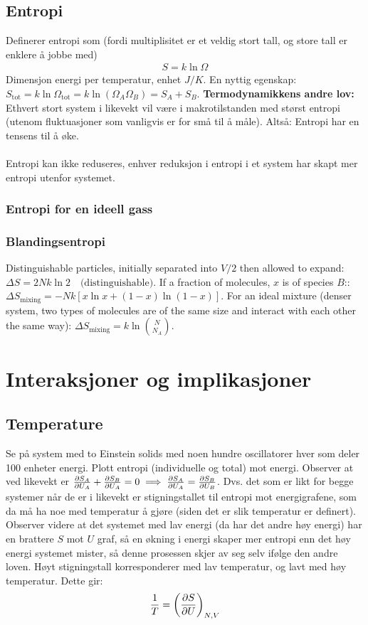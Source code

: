 \documentclass[12pt]{article}
\begin{document}
\subsection{Entropi}
Definerer entropi som (fordi multiplisitet er et veldig stort tall, og store tall er enklere å jobbe med)
\begin{align*}
  S = k \ln{\Omega}
\end{align*}
Dimensjon energi per temperatur, enhet $J/K$. En nyttig egenskap: $S_\text{tot} = k \ln{\Omega_\text{tot}} = k \ln{(\Omega_A \Omega_B)} = S_A + S_B$. \newline \noindent
\textbf{Termodynamikkens andre lov:} Ethvert stort system i likevekt vil være i
makrotilstanden med størst entropi (utenom fluktuasjoner som vanligvis er for små
til å måle). Altså: Entropi har en tensens til å øke.
\\ \\
Entropi kan ikke reduseres, enhver reduksjon i entropi i et system har skapt
mer entropi utenfor systemet.
\subsubsection{Entropi for en ideell gass}
\subsubsection{Blandingsentropi}
Distinguishable particles, initially separated into $V/2$ then allowed to expand:
$
\Delta S=2Nk\ln 2 \quad  (\mathrm{distinguishable)}
$.
If a fraction of molecules, $x$ is of species $B$::
$
\Delta S_{\mathrm{mixing}}=-Nk\left[x\ln x+(1-x)\ln (1-x)\right]
$.
For an ideal mixture (denser system, two types of molecules are of the same size and interact with each other the same way):
$
\Delta S_{\mathrm{mixing}}=k\ln {N\choose N_A}
$.
\section{Interaksjoner og implikasjoner}
\subsection{Temperature}
Se på system med to Einstein solids med noen hundre oscillatorer hver som deler
100 enheter energi. Plott entropi (individuelle og total) mot energi. Observer at
ved likevekt er $\pdv{S_A}{U_A} + \pdv{S_B}{U_A} = 0 \implies \pdv{S_A}{U_A} = \pdv{S_B}{U_B}$.
Dvs. det som er likt for begge systemer når de er i likevekt er stigningstallet til
entropi mot energigrafene, som da må ha noe med temperatur å gjøre (siden det er slik
temperatur er definert). Observer videre at det systemet med lav energi (da har det andre høy energi)
har en brattere $S$ mot $U$ graf, så en økning i energi skaper mer entropi enn det
høy energi systemet mister, så denne prosessen skjer av seg selv ifølge den andre loven.
Høyt stigningstall korresponderer med lav temperatur, og lavt med høy temperatur. Dette gir:
\begin{align*}
  \frac{1}{T} = \left(\pdv{S}{U} \right)_{N,V}
\end{align*}
\end{document}
